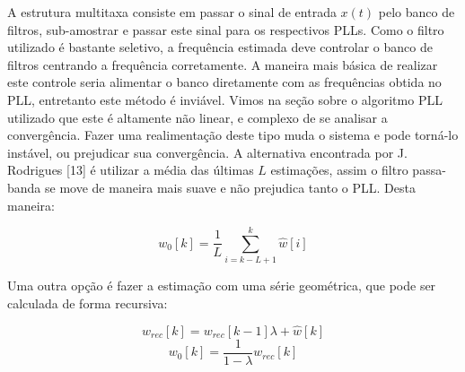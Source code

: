 \documentclass[a4paper, 12pt]{book}
\begin{document}
\indent A estrutura multitaxa consiste em passar o sinal de entrada $x(t)$ pelo banco de filtros, sub-amostrar e passar este sinal para os respectivos PLLs. Como o filtro utilizado é bastante seletivo, a frequência estimada deve controlar o banco de filtros centrando a frequência corretamente. A maneira mais básica de realizar este controle seria alimentar o banco diretamente com as frequências obtida no PLL, entretanto este método é inviável. Vimos na seção sobre o algoritmo PLL utilizado que este é altamente não linear, e complexo de se analisar a convergência. Fazer uma realimentação deste tipo muda o sistema e pode torná-lo instável, ou prejudicar sua convergência. A alternativa encontrada por J. Rodrigues [13]  é utilizar a média das últimas $L$ estimações, assim o filtro passa-banda se move de maneira mais suave e não prejudica tanto o PLL. Desta maneira:
   
\begin{equation}
w_0[k]=\frac{1}{L} \sum_{i=k-L+1}^{k}\hat{w}[i]
\end{equation}

\indent Uma outra opção é fazer a estimação com uma série geométrica, que pode ser calculada de forma recursiva:
 
\begin{equation}
w_{rec}[k]=w_{rec}[k-1]\lambda + \hat{w}[k]
\end{equation}
\begin{equation}
w_0[k]=\frac{1}{1-\lambda} w_{rec}[k]
\end{equation}
\end{document}
